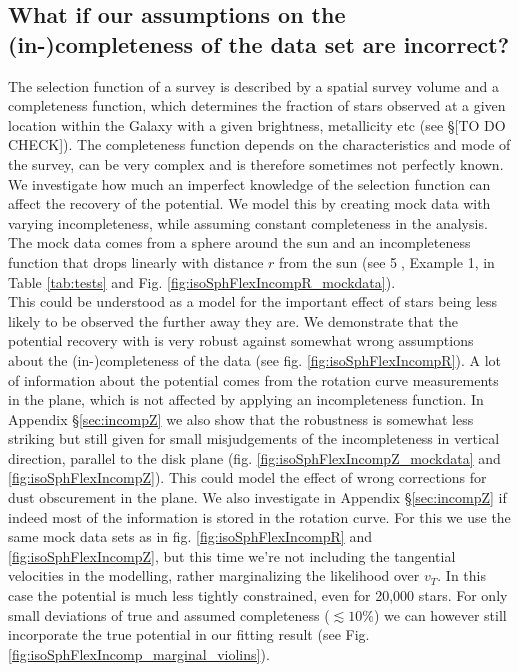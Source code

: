 \subsection{What if our assumptions on the (in-)completeness of the data set are incorrect?} \label{sec:incompR}

The selection function of a survey is described by a spatial survey volume and a completeness function, which determines the fraction of stars observed at a given location within the Galaxy with a given brightness, metallicity etc (see \S[TO DO CHECK]). The completeness function depends on the characteristics and mode of the survey, can be very complex and is therefore sometimes not perfectly known. We investigate how much an imperfect knowledge of the selection function can affect the recovery of the potential. We model this by creating mock data with varying incompleteness, while assuming constant completeness in the analysis. The mock data comes from a sphere around the sun and an incompleteness function that drops linearly with distance $r$ from the sun (see \textcircled{5}, Example 1, in Table \ref{tab:tests} and Fig. \ref{fig:isoSphFlexIncompR_mockdata}).
\\This could be understood as a model for the important effect of stars being less likely to be observed the further away they are. We demonstrate that the potential recovery with \RM is very robust against somewhat wrong assumptions about the (in-)completeness of the data (see fig. \ref{fig:isoSphFlexIncompR}). A lot of information about the potential comes from the rotation curve measurements in the plane, which is not affected by applying an incompleteness function. In Appendix \S\ref{sec:incompZ}  we also show that the robustness is somewhat less striking but still given for small misjudgements of the incompleteness in vertical direction, parallel to the disk plane (fig. \ref{fig:isoSphFlexIncompZ_mockdata} and \ref{fig:isoSphFlexIncompZ}). This could model the effect of wrong corrections for dust obscurement in the plane. We also investigate in Appendix \S\ref{sec:incompZ} if indeed most of the information is stored in the rotation curve. For this we use the same mock data sets as in fig. \ref{fig:isoSphFlexIncompR} and \ref{fig:isoSphFlexIncompZ}, but this time we’re not including the tangential velocities in the modelling, rather marginalizing the likelihood over $v_T$. In this case the potential is much less tightly constrained, even for 20,000 stars. For only small deviations of true and assumed completeness ($\lesssim 10\%$) we can however still incorporate the true potential in our fitting result (see Fig. \ref{fig:isoSphFlexIncomp_marginal_violins}). 



